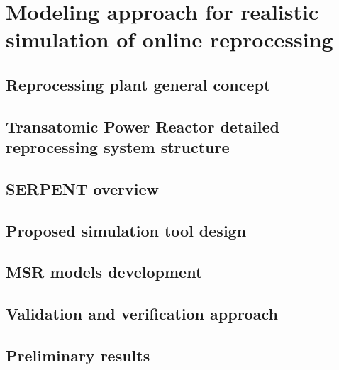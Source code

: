\chapter[Modeling approach for realistic simulation of online reprocessing]{Modeling approach for realistic simulation of online reprocessing}

\section{Reprocessing plant general concept}

\section{Transatomic Power Reactor detailed reprocessing system structure}

\section{SERPENT overview}

\section{Proposed simulation tool design}

\section{MSR models development}

\section{Validation and verification approach}

\section{Preliminary results}
